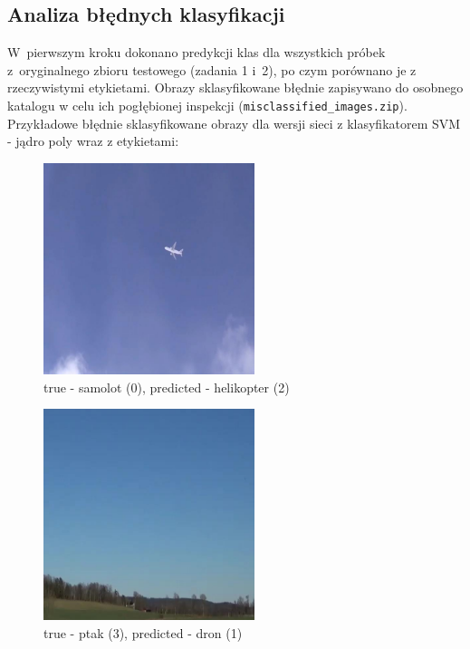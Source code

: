 \subsection{Analiza błędnych klasyfikacji}
W~pierwszym kroku dokonano predykcji klas dla wszystkich próbek z~oryginalnego zbioru testowego (zadania 1 i~2), po czym porównano je z rzeczywistymi etykietami. Obrazy sklasyfikowane błędnie zapisywano do osobnego katalogu w celu ich pogłębionej inspekcji (\texttt{misclassified\_images.zip}). 
Przykładowe błędnie sklasyfikowane obrazy dla wersji sieci z klasyfikatorem SVM - jądro poly wraz z etykietami:
\begin{figure}[H]
    \centering
    \includegraphics[width=0.55\textwidth]{img/zad3/8_true_samolot_pred_helikopter.png}
    \caption{true - samolot (0), predicted - helikopter (2)}
    \label{fig:z3_misclass}
\end{figure}
\begin{figure}[H]
    \centering
    \includegraphics[width=0.55\textwidth]{img/zad3/13_true_ptak_pred_dron.png}
    \caption{true - ptak (3), predicted - dron (1)}
    \label{fig:z3_misclass}
\end{figure}

